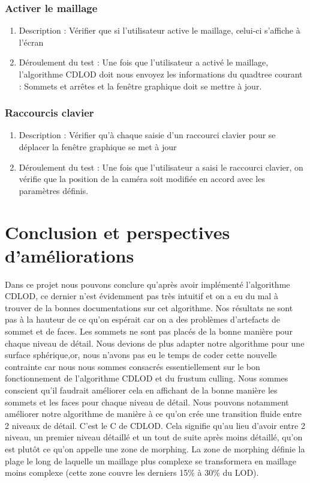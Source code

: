 \documentclass[12pt]{report}
\begin{document}
\subsection{Activer le maillage}
\begin{enumerate}
    \item Description : Vérifier que si l'utilisateur active le maillage, celui-ci s'affiche à l'écran
    \item Déroulement du test : Une fois que l'utilisateur a activé le maillage, l'algorithme CDLOD doit nous envoyez les informations du quadtree courant : Sommets et arrêtes et la fenêtre graphique doit se mettre à jour.
\end{enumerate}

\subsection{Raccourcis clavier}
\begin{enumerate}
    \item Description : Vérifier qu'à chaque saisie d'un raccourci clavier pour se déplacer la fenêtre graphique se met à jour
    \item Déroulement du test : Une fois que l'utilisateur a saisi le raccourci clavier, on vérifie que la position de la caméra soit modifiée en accord avec les paramètres définis.
\end{enumerate}


\chapter{Conclusion et perspectives d'améliorations}

Dans ce projet nous pouvons conclure qu'après avoir  implémenté l'algorithme CDLOD, ce dernier n'est évidemment pas très intuitif et on a eu du mal à trouver de la bonnes documentations sur cet algorithme.  Nos résultats ne sont pas à la hauteur de ce qu'on espérait car on a des problèmes d'artefacts de sommet et de faces. Les sommets ne sont pas placés de la bonne manière pour chaque niveau de détail. 
Nous devions de plus adapter notre algorithme pour une surface sphérique,or, nous n'avons pas eu le temps de coder cette nouvelle contrainte car nous nous sommes consacrés essentiellement sur le bon fonctionnement de l'algorithme CDLOD et du frustum culling. 
Nous sommes conscient qu'il faudrait améliorer cela en affichant de la bonne manière les sommets et les faces pour chaque niveau de détail.
Nous pouvons notamment améliorer notre algorithme de manière à ce qu'on crée une transition fluide entre 2 niveaux de détail. C'est le C de CDLOD. Cela signifie qu'au lieu d'avoir entre 2 niveau, un premier niveau détaillé et un tout de suite après moins détaillé,  qu'on est plutôt ce qu'on appelle une zone de morphing. La zone de morphing définie la plage le long de laquelle un maillage plus complexe se transformera en maillage moins complexe (cette zone couvre les derniers 15$\%$ à 30$\%$ du LOD).
\end{document}
